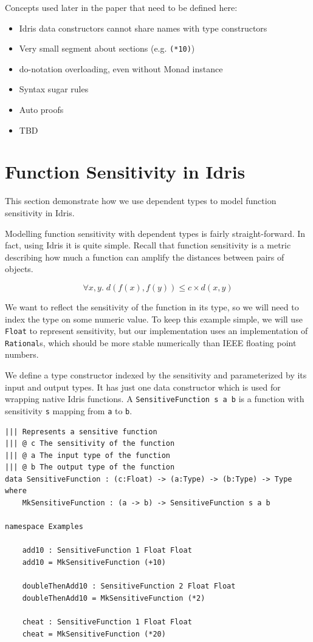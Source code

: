 \documentclass[12pt]{article}
\begin{document}
Concepts used later in the paper that need to be defined here:

\begin{itemize}
\item Idris data constructors cannot share names with type constructors
\item Very small segment about sections (e.g. \texttt{(*10)})
\item do-notation overloading, even without Monad instance
\item Syntax sugar rules
\item Auto proofs
\item TBD
\end{itemize}

\section{Function Sensitivity in Idris}\label{sec:function_sensitivity}

This section demonstrate how we use dependent types to model function sensitivity in Idris.

Modelling function sensitivity with dependent types is fairly straight-forward.
In fact, using Idris it is quite simple.
Recall that function sensitivity is a metric describing how much a function can amplify the distances between pairs of objects.

$$ \forall x,y.\; d(f(x),f(y)) \le c \times d(x,y) $$

We want to reflect the sensitivity of the function in its type, so we will need to index the type on some numeric value.
To keep this example simple, we will use \texttt{Float} to represent sensitivity, but our implementation uses an implementation of \texttt{Rational}s, which should be more stable numerically than IEEE floating point numbers.

We define a type constructor indexed by the sensitivity and parameterized by its input and output types.
It has just one data constructor which is used for wrapping native Idris functions.
A \texttt{SensitiveFunction s a b} is a function with sensitivity \texttt{s} mapping from \texttt{a} to \texttt{b}.

\begin{lstlisting}
||| Represents a sensitive function
||| @ c The sensitivity of the function
||| @ a The input type of the function
||| @ b The output type of the function
data SensitiveFunction : (c:Float) -> (a:Type) -> (b:Type) -> Type where
    MkSensitiveFunction : (a -> b) -> SensitiveFunction s a b

namespace Examples

    add10 : SensitiveFunction 1 Float Float
    add10 = MkSensitiveFunction (+10)

    doubleThenAdd10 : SensitiveFunction 2 Float Float
    doubleThenAdd10 = MkSensitiveFunction (*2)

    cheat : SensitiveFunction 1 Float Float
    cheat = MkSensitiveFunction (*20)
\end{lstlisting}
\end{document}
